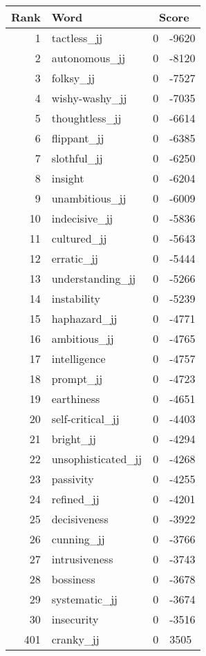 \begin{longtable}[!htbp]{| rlr@{.}l |}
    \hline
    \textbf{Rank} & \textbf{Word} & \multicolumn{2}{c|}{\textbf{Score}} \\
    \hline
    \endhead
    1 & tactless\_jj & 0 & -9620 \\
    2 & autonomous\_jj & 0 & -8120 \\
    3 & folksy\_jj & 0 & -7527 \\
    4 & wishy-washy\_jj & 0 & -7035 \\
    5 & thoughtless\_jj & 0 & -6614 \\
    6 & flippant\_jj & 0 & -6385 \\
    7 & slothful\_jj & 0 & -6250 \\
    8 & insight & 0 & -6204 \\
    9 & unambitious\_jj & 0 & -6009 \\
    10 & indecisive\_jj & 0 & -5836 \\
    11 & cultured\_jj & 0 & -5643 \\
    12 & erratic\_jj & 0 & -5444 \\
    13 & understanding\_jj & 0 & -5266 \\
    14 & instability & 0 & -5239 \\
    15 & haphazard\_jj & 0 & -4771 \\
    16 & ambitious\_jj & 0 & -4765 \\
    17 & intelligence & 0 & -4757 \\
    18 & prompt\_jj & 0 & -4723 \\
    19 & earthiness & 0 & -4651 \\
    20 & self-critical\_jj & 0 & -4403 \\
    21 & bright\_jj & 0 & -4294 \\
    22 & unsophisticated\_jj & 0 & -4268 \\
    23 & passivity & 0 & -4255 \\
    24 & refined\_jj & 0 & -4201 \\
    25 & decisiveness & 0 & -3922 \\
    26 & cunning\_jj & 0 & -3766 \\
    27 & intrusiveness & 0 & -3743 \\
    28 & bossiness & 0 & -3678 \\
    29 & systematic\_jj & 0 & -3674 \\
    30 & insecurity & 0 & -3516 \\
    401 & cranky\_jj & 0 & 3505 \\

\end{longtable}
